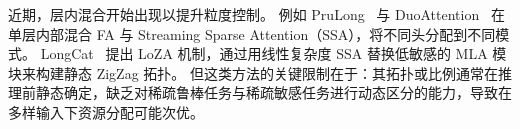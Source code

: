 近期，层内混合开始出现以提升粒度控制。
例如 PruLong~\citep{bhaskar2025cache} 与 DuoAttention~\citep{duoattention} 在单层内部混合 FA 与 Streaming Sparse Attention（SSA），将不同头分配到不同模式。
LongCat~\citep{zhang2025efficient} 提出 LoZA 机制，通过用线性复杂度 SSA 替换低敏感的 MLA 模块来构建静态 ZigZag 拓扑。
但这类方法的关键限制在于：其拓扑或比例通常在推理前静态确定，缺乏对稀疏鲁棒任务与稀疏敏感任务进行动态区分的能力，导致在多样输入下资源分配可能次优。

